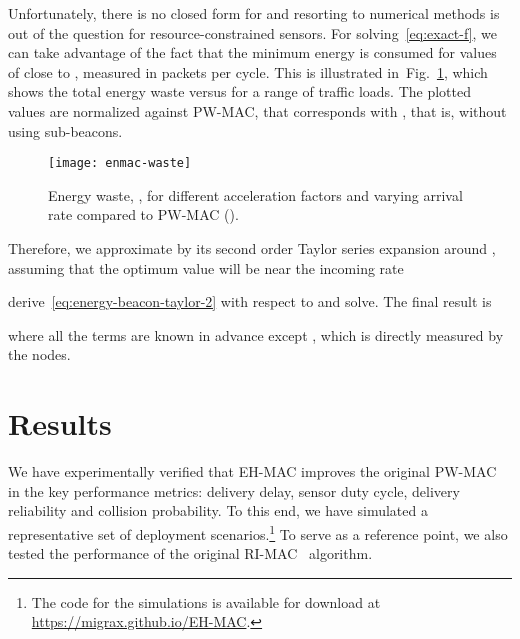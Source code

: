 \documentclass[journal,english,twocolumn,10pt,letterpaper]{IEEEtran}
\begin{document}
Unfortunately, there is no closed form for  and resorting to numerical
methods is out of the question for resource-constrained sensors.
For solving~\eqref{eq:exact-f}, we can take advantage of the fact that the
minimum energy is consumed for values of  close to , measured in
packets per cycle. This is illustrated in~Fig.~\ref{fig:profit}, which shows
the total energy waste  versus  for a range of traffic
loads. The plotted values are normalized against PW-MAC, that corresponds with
, that is, without using sub-beacons.
\begin{figure}
  \centering
  \texttt{[image: enmac-waste]}
  \caption{Energy waste, , for different acceleration factors
     and varying arrival rate  compared to PW-MAC ().}
  \label{fig:profit}
\end{figure}
Therefore, we approximate  by its second order Taylor series
expansion around , assuming that the optimum  value will be near
the incoming rate

derive~\eqref{eq:energy-beacon-taylor-2} with respect to  and solve. The
final result is

where all the terms are known in advance except , which is directly
measured by the nodes.


\section{Results}
\label{sec:results}

We have experimentally verified that EH-MAC improves the
original PW-MAC in the key performance metrics: delivery delay, sensor duty
cycle, delivery reliability and collision probability. To this end, we have
simulated a representative set of deployment scenarios.\footnote{The code for
  the simulations is available for download at
  \url{https://migrax.github.io/EH-MAC}.} To serve as a reference point, we
also tested the performance of the original RI-MAC~\cite{sun08:_ri_mac}
algorithm.
\end{document}
